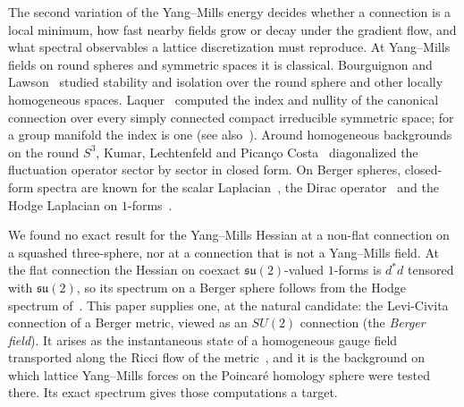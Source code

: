 \documentclass[11pt]{article}
\theoremstyle{definition}
\theoremstyle{remark}
\newcommand{\su}{\mathfrak{su}(2)}
\begin{document}
The second variation of the Yang--Mills energy decides whether a connection is a local minimum, how
fast nearby fields grow or decay under the gradient flow, and what spectral observables a lattice
discretization must reproduce. At Yang--Mills fields on round spheres and symmetric spaces it is
classical. Bourguignon and Lawson~\cite{bl1981} studied stability and isolation over the round
sphere and other locally homogeneous spaces. Laquer~\cite{laquer1984} computed the index and nullity
of the canonical connection over every simply connected compact irreducible symmetric space; for a
group manifold the index is one (see also~\cite{ohnitapan1989}). Around homogeneous backgrounds on
the round $S^3$, Kumar, Lechtenfeld and Pican\c{c}o Costa~\cite{klc2021} diagonalized the
fluctuation operator sector by sector in closed form. On Berger spheres, closed-form spectra are known
for the scalar Laplacian~\cite{lauret2019}, the Dirac operator~\cite{hitchin1974,bar1992,klingschueth2022} and
the Hodge Laplacian on $1$-forms~\cite{henkellauret2026}.

We found no exact result for the Yang--Mills Hessian at a non-flat connection on a squashed
three-sphere, nor at a connection that is not a Yang--Mills field. At the flat connection the Hessian
on coexact $\su$-valued $1$-forms is $d^*d$ tensored with $\su$, so its spectrum on a Berger sphere follows
from the Hodge spectrum of~\cite{henkellauret2026}. This paper supplies one, at the natural candidate: the Levi-Civita
connection of a Berger metric, viewed as an $SU(2)$ connection (the \emph{Berger field}). It arises as
the instantaneous state of a homogeneous gauge field transported along the Ricci flow of the
metric~\cite{davisrtc}, and it is the background on which lattice Yang--Mills forces on the
Poincar\'e homology sphere were tested there. Its exact spectrum gives those computations a target.
\end{document}
